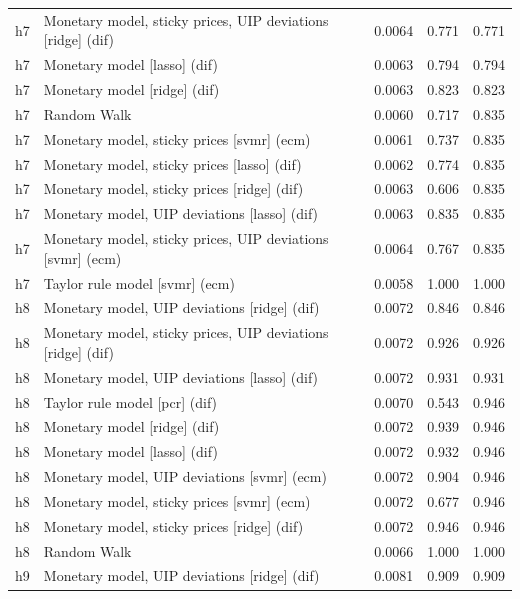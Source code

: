 \begin{ThreePartTable}
\begin{longtable}[t]{cp{5.5cm}ccc}
\addlinespace
h7 & \raggedright Monetary model, sticky prices, UIP deviations [ridge] (dif) & 0.0064 & 0.771 & 0.771\\
h7 & \raggedright Monetary model [lasso] (dif) & 0.0063 & 0.794 & 0.794\\
h7 & \raggedright Monetary model [ridge] (dif) & 0.0063 & 0.823 & 0.823\\
h7 & \raggedright Random Walk & 0.0060 & 0.717 & 0.835\\
h7 & \raggedright Monetary model, sticky prices [svmr] (ecm) & 0.0061 & 0.737 & 0.835\\
h7 & \raggedright Monetary model, sticky prices [lasso] (dif) & 0.0062 & 0.774 & 0.835\\
h7 & \raggedright Monetary model, sticky prices [ridge] (dif) & 0.0063 & 0.606 & 0.835\\
h7 & \raggedright Monetary model, UIP deviations [lasso] (dif) & 0.0063 & 0.835 & 0.835\\
h7 & \raggedright Monetary model, sticky prices, UIP deviations [svmr] (ecm) & 0.0064 & 0.767 & 0.835\\
h7 & \raggedright Taylor rule model [svmr] (ecm) & 0.0058 & 1.000 & 1.000\\
\addlinespace
h8 & \raggedright Monetary model, UIP deviations [ridge] (dif) & 0.0072 & 0.846 & 0.846\\
h8 & \raggedright Monetary model, sticky prices, UIP deviations [ridge] (dif) & 0.0072 & 0.926 & 0.926\\
h8 & \raggedright Monetary model, UIP deviations [lasso] (dif) & 0.0072 & 0.931 & 0.931\\
h8 & \raggedright Taylor rule model [pcr] (dif) & 0.0070 & 0.543 & 0.946\\
h8 & \raggedright Monetary model [ridge] (dif) & 0.0072 & 0.939 & 0.946\\
h8 & \raggedright Monetary model [lasso] (dif) & 0.0072 & 0.932 & 0.946\\
h8 & \raggedright Monetary model, UIP deviations [svmr] (ecm) & 0.0072 & 0.904 & 0.946\\
h8 & \raggedright Monetary model, sticky prices [svmr] (ecm) & 0.0072 & 0.677 & 0.946\\
h8 & \raggedright Monetary model, sticky prices [ridge] (dif) & 0.0072 & 0.946 & 0.946\\
h8 & \raggedright Random Walk & 0.0066 & 1.000 & 1.000\\
\addlinespace
h9 & \raggedright Monetary model, UIP deviations [ridge] (dif) & 0.0081 & 0.909 & 0.909\\

\end{longtable}
\end{ThreePartTable}
